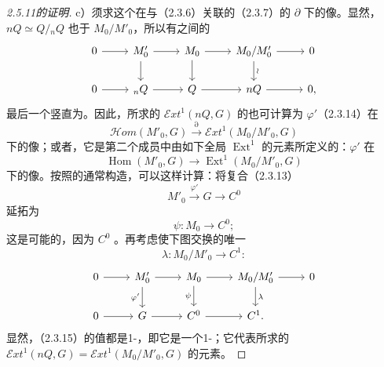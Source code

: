 \begin{proof}[2.5.11的证明]
 c）须求这个在与（2.3.6）关联的（2.3.7）的 $\partial$ 下的像。显然，$nQ\simeq Q/{}_nQ$ 也于 $M_0/M'_0$，所以有之间的
\[\begin{tikzcd}
0\arrow[r]&M'_0\arrow[r]\arrow[d]&M_0\arrow[r]\arrow[d]&M_0/M'_0\arrow[r]\arrow[d,"\wr"]&0\\
0\arrow[r]&{}_nQ\arrow[r]&Q\arrow[r]&nQ\arrow[r]&0,
\end{tikzcd}\]
最后一个竖直为。因此，所求的 $\mathcal Ext^1(nQ,G)$ 的也可计算为 $\varphi'$（2.3.14）在
\[\mathcal Hom(M'_0,G)\xrightarrow{\partial}\mathcal Ext^1(M_0/M'_0,G)\]
下的像；或者，它是第二个成员中由如下全局 $\operatorname{Ext}^1$ 的元素所定义的：$\varphi'$ 在
\[\operatorname{Hom}(M'_0,G)\longrightarrow\operatorname{Ext}^1(M_0/M'_0,G)\]
下的像。按照的通常构造，可以这样计算：将复合（2.3.13）
\[M'_0\xrightarrow{\varphi'}G\longrightarrow C^0\]
延拓为
\[\psi:M_0\longrightarrow C^0;\]
这是可能的，因为 $C^0$ 。再考虑使下图交换的唯一
\[\lambda:M_0/M'_0\longrightarrow C^1:\tag{2.3.15}\]
\[\begin{tikzcd}
0\arrow[r]&M'_0\arrow[r]\arrow[d,"\varphi'"']&M_0\arrow[r]\arrow[d,"\psi"']&M_0/M'_0\arrow[r]\arrow[d,"\lambda"]&0\\
0\arrow[r]&G\arrow[r]&C^0\arrow[r]&C^1.&
\end{tikzcd}\]
显然，（2.3.15）的值都是1-，即它是一个1-；它代表所求的 $\mathcal Ext^1(nQ,G)=\mathcal Ext^1(M_0/M'_0,G)$ 的元素。


\end{proof}

